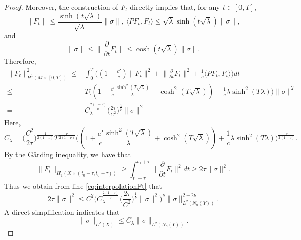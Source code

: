 \documentclass[12pt, reqno]{amsart}
\theoremstyle{plain}%
\theoremstyle{definition}
\theoremstyle{remark}
\numberwithin{equation}{section}
\begin{document}
\begin{proof}
	Moreover, the construction of $F_t$ directly implies that, for any $t\in[0,T]$,
	$$\|F_t\|\leq \frac{\sinh(t\sqrt\lambda)}{\sqrt\lambda}\|\sigma\|,~\langle PF_t,F_t\rangle\leq \sqrt{\lambda}\sinh(t\sqrt{\lambda})\|\sigma\|,$$
	and
	$$\|\sigma\|\leq \Big\|\frac{\partial}{\partial t}F_t\Big\|\leq \cosh(t\sqrt{\lambda})\|\sigma\|.$$
	Therefore,
	\begin{align*}
		\|F_t\|_{H^1(M\times[0,T])}^2\leq&\int_0^T\Big((1+\frac{c'}{c})\|F_t\|^2+\Big\|\frac{\partial}{\partial t}F_t\Big\|^2+\frac 1 c\langle PF_t,F_t\rangle\Big) dt\\
		\leq &T\Big((1+\frac{c'}{c}\frac{\sinh^2(T\sqrt\lambda)}{\lambda}+\cosh^2(T\sqrt{\lambda}))+\frac 1 c\lambda\sinh^2(T\lambda)\Big)\|\sigma\|^2\\
		=&C_\lambda^{\frac{2(1-\nu)}{\nu}}\big(\frac{2\tau}{C^2}\big)^{\frac{1}{\nu}}\|\sigma\|^2
	\end{align*}
	Here, $$C_\lambda=\big(\frac{C^2}{2\tau}\big)^{\frac{1}{2(1-\nu)}}T^{\frac{\nu}{2(1-\nu)}}\Big((1+\frac{c'}{c}\frac{\sinh^2(T\sqrt\lambda)}{\lambda}+\cosh^2(T\sqrt{\lambda}))+\frac 1 c\lambda\sinh^2(T\lambda)\Big)^{\frac{\nu}{2(1-\nu)}}.$$
	By the G\r{a}rding inequality, we have that
	$$\|F_t\|_{H_1(X\times (t_0-\tau,t_0+\tau))}\geq \int_{t_0-\tau}^{t_0+\tau}\Big\|\frac{\partial}{\partial t}F_t\Big\|^2 dt\geq 2\tau \|\sigma\|^2.$$
	Thus we obtain from line \eqref{eq:interpolationFt} that
	{
	$$2\tau \|\sigma\|^2\leq C^2 \Big(C_\lambda^{\frac{2(1-\nu)}{\nu}}\big(\frac{2\tau}{C^2}\big)^{\frac{1}{\nu}}\|\sigma\|^2\Big)^\nu\|\sigma\|_{L^2(N_a(Y))}^{2-2\nu}.$$	}
	A direct simplification indicates that 
	$$\|\sigma\|_{L^2(X)}\leq C_\lambda\|\sigma\|_{L^2(N_a(Y))}.$$

\end{proof}
\end{document}

